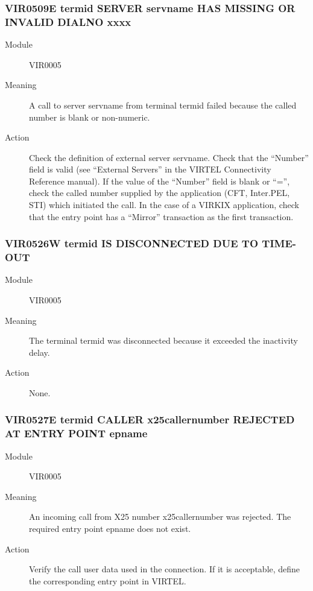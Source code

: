 \documentclass[letterpaper,10pt,english]{sphinxmanual}
\begin{document}
\subsubsection{VIR0509E termid SERVER servname HAS MISSING OR INVALID DIALNO xxxx}
\label{\detokenize{messages:vir0509e-termid-server-servname-has-missing-or-invalid-dialno-xxxx}}\begin{description}
\item[{Module}] \leavevmode
VIR0005

\item[{Meaning}] \leavevmode
A call to server servname from terminal termid failed because the called number is blank or non-numeric.

\item[{Action}] \leavevmode
Check the definition of external server servname. Check that the “Number” field is valid (see “External Servers” in the VIRTEL Connectivity Reference manual). If the value of the “Number” field is blank or “=”, check the called number supplied by the application (CFT, Inter.PEL, STI) which initiated the call. In the case of a VIRKIX application, check that the entry point has a “Mirror” transaction as the first transaction.

\end{description}


\subsubsection{VIR0526W termid IS DISCONNECTED DUE TO TIME-OUT}
\label{\detokenize{messages:vir0526w-termid-is-disconnected-due-to-time-out}}\begin{description}
\item[{Module}] \leavevmode
VIR0005

\item[{Meaning}] \leavevmode
The terminal termid was disconnected because it exceeded the inactivity delay.

\item[{Action}] \leavevmode
None.

\end{description}


\subsubsection{VIR0527E termid CALLER x25callernumber REJECTED AT ENTRY POINT epname}
\label{\detokenize{messages:vir0527e-termid-caller-x25callernumber-rejected-at-entry-point-epname}}\begin{description}
\item[{Module}] \leavevmode
VIR0005

\item[{Meaning}] \leavevmode
An incoming call from X25 number x25callernumber was rejected. The required entry point epname does not exist.

\item[{Action}] \leavevmode
Verify the call user data used in the connection. If it is acceptable, define the corresponding entry point in VIRTEL.

\end{description}
\end{document}
